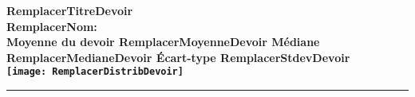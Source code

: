 \documentclass[11pt,a4paper,landscape,twocolumn]{article}
\begin{document}
\begin{center}
  \Large\bf
  RemplacerTitreDevoir\\
  RemplacerNom: \\
  Moyenne du devoir \num{RemplacerMoyenneDevoir}
  \;
  Médiane \num{RemplacerMedianeDevoir}
  \;
  Écart-type \num{RemplacerStdevDevoir}\\
  \texttt{[image: RemplacerDistribDevoir]}
\end{center}

\hrule
\end{document}
